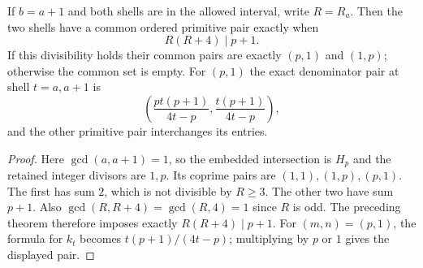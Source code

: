 \begin{corollary}
\label{cor:connes-consecutive}
If $b=a+1$ and both shells are in the allowed interval, write $R=R_a$.
Then the two shells have a common ordered primitive pair exactly when
\[
 R(R+4)\mid p+1.
\]
If this divisibility holds their common pairs are exactly $(p,1)$ and
$(1,p)$; otherwise the common set is empty.
For $(p,1)$ the exact denominator pair at shell $t=a,a+1$ is
\[
 \left(\frac{pt(p+1)}{4t-p},\frac{t(p+1)}{4t-p}\right),
\]
and the other primitive pair interchanges its entries.
\end{corollary}
\begin{proof}
Here $\gcd(a,a+1)=1$, so the embedded intersection is $H_p$ and the
retained integer divisors are $1,p$.  Its coprime pairs are
$(1,1),(1,p),(p,1)$.  The first has sum $2$, which is not divisible by
$R\ge3$.  The other two have sum $p+1$.
Also $\gcd(R,R+4)=\gcd(R,4)=1$ since $R$ is odd.  The preceding theorem
therefore imposes exactly $R(R+4)\mid p+1$.
For $(m,n)=(p,1)$, the formula for $k_t$ becomes
$t(p+1)/(4t-p)$; multiplying by $p$ or $1$ gives the displayed pair.
\end{proof}

